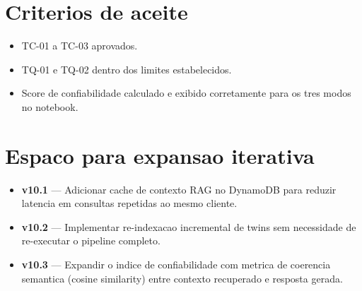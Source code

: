 \section{Criterios de aceite}

\begin{itemize}[leftmargin=*]
  \item TC-01 a TC-03 aprovados.
  \item TQ-01 e TQ-02 dentro dos limites estabelecidos.
  \item Score de confiabilidade calculado e exibido corretamente
        para os tres modos no notebook.
\end{itemize}

\section{Espaco para expansao iterativa}

\begin{itemize}[leftmargin=*]
  \item \textbf{v10.1} --- Adicionar cache de contexto RAG no DynamoDB
        para reduzir latencia em consultas repetidas ao mesmo cliente.
  \item \textbf{v10.2} --- Implementar re-indexacao incremental de twins
        sem necessidade de re-executar o pipeline completo.
  \item \textbf{v10.3} --- Expandir o indice de confiabilidade com
        metrica de coerencia semantica (cosine similarity) entre
        contexto recuperado e resposta gerada.
\end{itemize}
